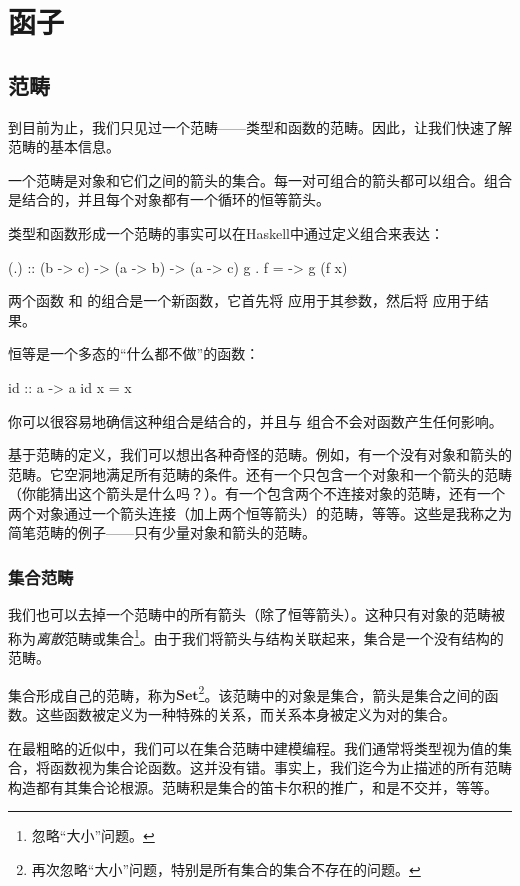 \documentclass[DaoFP]{subfiles}
\begin{document}
\setcounter{chapter}{7}

\chapter{函子}
\section{范畴}

到目前为止，我们只见过一个范畴——类型和函数的范畴。因此，让我们快速了解范畴的基本信息。

一个范畴是对象和它们之间的箭头的集合。每一对可组合的箭头都可以组合。组合是结合的，并且每个对象都有一个循环的恒等箭头。

类型和函数形成一个范畴的事实可以在Haskell中通过定义组合来表达：
\begin{haskell}
(.) :: (b -> c) -> (a -> b) -> (a -> c)
g . f = \x -> g (f x)
\end{haskell}
两个函数  和  的组合是一个新函数，它首先将  应用于其参数，然后将  应用于结果。

恒等是一个多态的“什么都不做”的函数：
\begin{haskell}
id :: a -> a
id x = x
\end{haskell}
你可以很容易地确信这种组合是结合的，并且与  组合不会对函数产生任何影响。

基于范畴的定义，我们可以想出各种奇怪的范畴。例如，有一个没有对象和箭头的范畴。它空洞地满足所有范畴的条件。还有一个只包含一个对象和一个箭头的范畴（你能猜出这个箭头是什么吗？）。有一个包含两个不连接对象的范畴，还有一个两个对象通过一个箭头连接（加上两个恒等箭头）的范畴，等等。这些是我称之为简笔范畴的例子——只有少量对象和箭头的范畴。
\subsection{集合范畴}

我们也可以去掉一个范畴中的所有箭头（除了恒等箭头）。这种只有对象的范畴被称为\emph{离散}范畴或集合\footnote{忽略“大小”问题。}。由于我们将箭头与结构关联起来，集合是一个没有结构的范畴。

集合形成自己的范畴，称为$\mathbf{Set}$\footnote{再次忽略“大小”问题，特别是所有集合的集合不存在的问题。}。该范畴中的对象是集合，箭头是集合之间的函数。这些函数被定义为一种特殊的关系，而关系本身被定义为对的集合。

在最粗略的近似中，我们可以在集合范畴中建模编程。我们通常将类型视为值的集合，将函数视为集合论函数。这并没有错。事实上，我们迄今为止描述的所有范畴构造都有其集合论根源。范畴积是集合的笛卡尔积的推广，和是不交并，等等。
\end{document}
